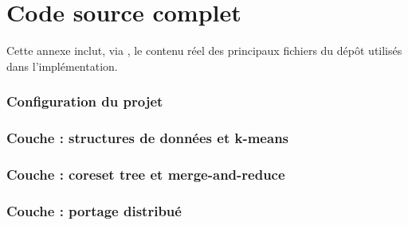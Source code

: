 
\chapter{Code source complet}
\label{ann:code}

Cette annexe inclut, via , le contenu
réel des principaux fichiers du dépôt  utilisés dans
l'implémentation.

\subsection{Configuration du projet}



\subsection{Couche  : structures de données et k-means}





\subsection{Couche  : coreset tree et merge-and-reduce}





\subsection{Couche  : portage distribué}



